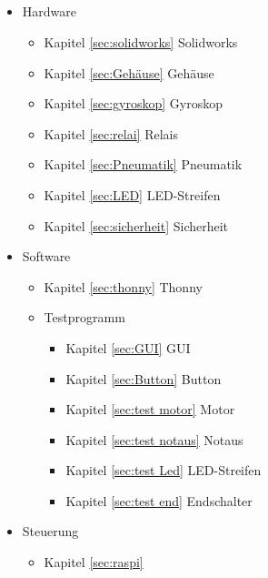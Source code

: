 \subsection{\nameJS}
\begin{itemize}
    \item Hardware
    \begin{itemize}
        \item Kapitel \ref{sec:solidworks} Solidworks 
        \item Kapitel \ref{sec:Gehäuse} Gehäuse 
        \item Kapitel \ref{sec:gyroskop} Gyroskop 
        \item Kapitel \ref{sec:relai} Relais
        \item Kapitel \ref{sec:Pneumatik} Pneumatik
        \item Kapitel \ref{sec:LED} LED-Streifen 
        \item Kapitel \ref{sec:sicherheit} Sicherheit 
    \end{itemize}
    \item Software
    \begin{itemize}
        \item Kapitel \ref{sec:thonny} Thonny 
        \item Testprogramm
        \begin{itemize}
            \item Kapitel \ref{sec:GUI} GUI 
            \item Kapitel \ref{sec:Button} Button 
            \item Kapitel \ref{sec:test motor} Motor
            \item Kapitel \ref{sec:test notaus} Notaus 
            \item Kapitel \ref{sec:test Led} LED-Streifen
            \item Kapitel \ref{sec:test end} Endschalter
        \end{itemize}
    \end{itemize}
    \item Steuerung
    \begin{itemize}
        \item Kapitel \ref{sec:raspi} \raspi 
    \end{itemize}
\end{itemize}

